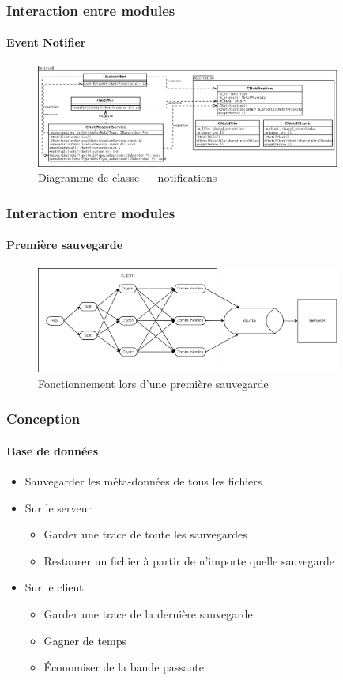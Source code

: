 \documentclass{beamer}
\begin{document}
\begin{frame}
 \frametitle{Interaction entre modules}
 \framesubtitle{Event Notifier}
  \begin{figure}
    \centering
    \includegraphics[width=10cm]{softwareDesign/classDiagramNotif.png}
    \caption{Diagramme de classe --- notifications}
  \end{figure}
\end{frame}

\begin{frame}
 \frametitle{Interaction entre modules}
 \framesubtitle{Premi\`ere sauvegarde}
  \begin{figure}
    \centering
    \includegraphics[width=10cm]{softwareDesign/moduleInteraction.png}
    \caption{Fonctionnement lors d'une premi\`ere sauvegarde}
  \end{figure}
\end{frame}

\begin{frame}
 \frametitle{Conception}
 \framesubtitle{Base de donn\'ees}
 \begin{itemize}
  \item Sauvegarder les m\'eta-donn\'ees de tous les fichiers
  \item Sur le serveur
  \begin{itemize}
   \item Garder une trace de toute les sauvegardes
   \item Restaurer un fichier \`a partir de n'importe quelle sauvegarde
  \end{itemize}
  \item Sur le client
  \begin{itemize}
   \item Garder une trace de la derni\`ere sauvegarde
   \item Gagner de temps
   \item \'Economiser de la bande passante
  \end{itemize}
 \end{itemize}
\end{frame}
\end{document}
